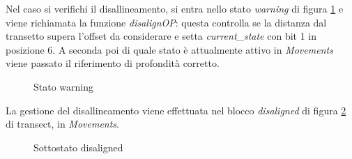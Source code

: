 \documentclass{article}
\begin{document}
            
            Nel caso si verifichi il disallineamento, si entra nello stato \emph{warning} di figura \ref{fig:warn} e viene richiamata 
            la funzione \emph{disalignOP}: questa controlla se la distanza dal transetto supera l'offset da considerare e setta \emph{current\_state} con bit 1 in posizione 6.
            A seconda poi di quale stato è attualmente attivo in \emph{Movements} viene passato il riferimento di profondità corretto. 

            \begin{figure} [ht]
                \caption{Stato warning}
                \label{fig:warn}
            \end{figure}

            La gestione del disallineamento viene effettuata nel blocco \emph{disaligned} di figura \ref{fig:dis} di transect, in \emph{Movements}.\\ 

            \begin{figure} [ht]
                \caption{Sottostato disaligned}
                \label{fig:dis}
            \end{figure}
\end{document}
